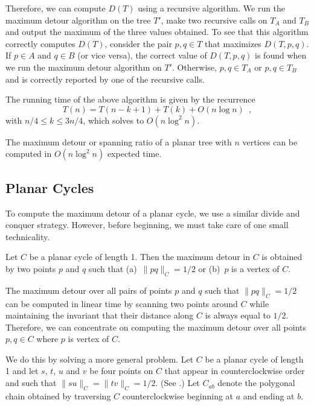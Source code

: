 \documentclass[lotsofwhite]{patmorin}
\begin{document}
Therefore, we can compute $D(T)$ using a recursive algorithm.  We run
the maximum detour algorithm on the tree $T'$, make two recursive
calls on $T_A$ and $T_B$ and output the maximum of the three values
obtained.  To see that this algorithm correctly computes $D(T)$,
consider the pair $p,q\in T$ that maximizes $D(T,p,q)$.  If $p\in A$
and $q\in B$ (or vice versa), the correct value of $D(T,p,q)$ is found
when we run the maximum detour algorithm on $T'$.  Otherwise, $p,q\in
T_A$ or $p,q\in T_B$ and is correctly reported by one of the recursive
calls.

The running time of the above algorithm is given by the recurrence
\[ 
   T(n)=T(n-k+1)+T(k)+O(n\log n) \enspace , 
\]
with $n/4\le k\le 3n/4$, which solves to $O(n\log^2
n)$.

\begin{thm}
The maximum detour or spanning ratio of a planar tree with $n$
vertices can be computed in $O(n\log^2 n)$ expected time.
\end{thm}

\subsection{Planar Cycles}

To compute the maximum detour of a planar cycle, we use a similar
divide and conquer strategy.  However, before beginning, we must
take care of one small technicality.

\begin{lem}
Let $C$ be a planar cycle of length 1.  Then the maximum detour in $C$
is obtained by two points $p$ and $q$ such that
(a)~$\|pq\|_C = 1/2$ or (b)~$p$ is a vertex of $C$.
\end{lem}

The maximum detour over all pairs of points $p$ and $q$ such that
$\|pq\|_C=1/2$ can be computed in linear time by scanning two points
around $C$ while maintaining the invariant that their distance along
$C$ is always equal to $1/2$.  Therefore, we can concentrate on
computing the maximum detour over all points $p,q\in C$ where $p$ is
vertex of $C$.

We do this by solving a more general problem. Let $C$ be a planar
cycle of length 1 and let $s$, $t$, $u$ and $v$ be four points on $C$
that appear in counterclockwise order and such that $\|su\|_C =
\|tv\|_C = 1/2$. (See .) Let $C_{ab}$ denote the
polygonal chain obtained by traversing $C$ counterclockwise beginning
at $a$ and ending at $b$.
\end{document}
